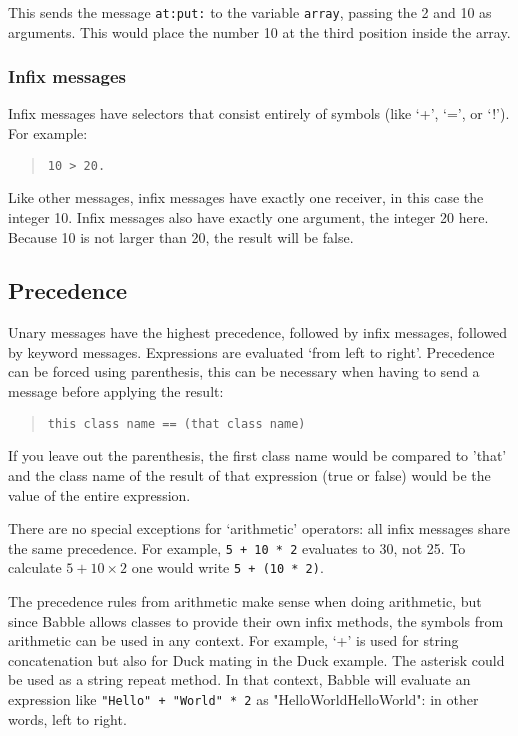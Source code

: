 \documentclass[a4paper]{article}
\begin{document}
This sends the message \texttt{at:put:} to the variable \texttt{array}, passing the 2 and 10 as arguments. This would place the number 10 at the third position inside the array.



\subsubsection{Infix messages}

Infix messages have selectors that consist entirely of symbols (like `+', `=', or `!'). For example:

\begin{quote}
\begin{lstlisting}
10 > 20.
\end{lstlisting}
\end{quote}

Like other messages, infix messages have exactly one receiver, in this case the integer 10.
Infix messages also have exactly one argument, the integer 20 here.
Because 10 is not larger than 20, the result will be false.


\subsection{Precedence}

Unary messages have the highest precedence, followed by infix messages, followed by keyword messages. Expressions are evaluated `from left to right'. Precedence can be forced using parenthesis, this can be necessary when having to send a message before applying the result:
\begin{quote}
\begin{lstlisting}
this class name == (that class name)
\end{lstlisting}
\end{quote}
If you leave out the parenthesis, the first class name would be compared to 'that' and the class name of the result of that expression (true or false) would be the value of the entire expression.

There are no special exceptions for `arithmetic' operators: all infix messages share the same precedence.
For example, \texttt{5 + 10 * 2} evaluates to 30, not 25.
To calculate $5 + 10 \times 2$ one would write \texttt{5 + (10 * 2)}.

The precedence rules from arithmetic make sense when doing arithmetic, but since Babble allows classes to provide their own infix methods, the symbols from arithmetic can be used in any context.
For example, `+' is used for string concatenation but also for Duck mating in the Duck example.
The asterisk could  be used as a string repeat method.
In that context, Babble will evaluate an expression like \texttt{"Hello" + "World" * 2} as "HelloWorldHelloWorld": in other words, left to right.
\end{document}
